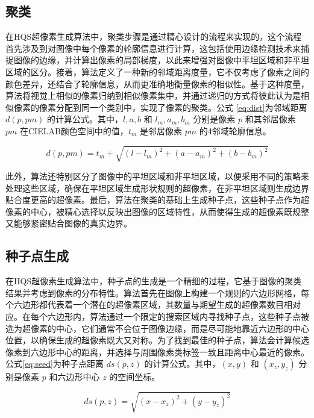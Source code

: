 \newpage

\subsection{聚类}
在HQS超像素生成算法中，聚类步骤是通过精心设计的流程来实现的，这个流程首先涉及到对图像中每个像素的轮廓信息进行计算，这包括使用边缘检测技术来捕捉图像的边缘，并计算出像素的局部梯度，以此来增强对图像中平坦区域和非平坦区域的区分。接着，算法定义了一种新的邻域距离度量，它不仅考虑了像素之间的颜色差异，还结合了轮廓信息，从而更准确地衡量像素的相似性。基于这种度量，算法将视觉上相似的像素归纳到相似像素集中，并通过递归的方式将彼此认为是相似像素的像素分配到同一个类别中，实现了像素的聚类。\cite{achanta2012slic}公式 \eqref{eq:dist}为邻域距离 \( d(p, pm) \) 的计算公式。其中，\( l, a, b \) 和 \( l_m, a_m, b_m \) 分别是像素 \( p \) 和其邻居像素 \( pm \) 在CIELAB颜色空间中的值，\( t_m \) 是邻居像素 \( pm \) 的4邻域轮廓信息。

\begin{equation}
  d(p, pm) = t_m + \sqrt{(l - l_m)^2 + (a - a_m)^2 + (b - b_m)^2}
  \label{eq:dist}
\end{equation}

此外，算法还特别区分了图像中的平坦区域和非平坦区域，以便采用不同的策略来处理这些区域，确保在平坦区域生成形状规则的超像素，在非平坦区域则生成边界贴合度更高的超像素。最后，算法在聚类的基础上生成种子点，这些种子点作为超像素的中心，被精心选择以反映出图像的区域特性，从而使得生成的超像素既规整又能够紧密贴合图像的真实边界。

\subsection{种子点生成}
在HQS超像素生成算法中，种子点的生成是一个精细的过程，它基于图像的聚类结果并考虑到像素的分布特性。算法首先在图像上构建一个规则的六边形网格，每个六边形都代表着一个潜在的超像素区域，其数量与期望生成的超像素数目相对应。在每个六边形内，算法通过一个限定的搜索区域内寻找种子点，这些种子点被选为超像素的中心，它们通常不会位于图像边缘，而是尽可能地靠近六边形的中心位置，以确保生成的超像素既大又对称。为了找到最佳的种子点，算法会计算候选像素到六边形中心的距离，并选择与周围像素类标签一致且距离中心最近的像素。公式\eqref{eq:seed}为种子点距离 \( ds(p, z) \) 的计算公式。其中，\( (x, y) \) 和 \( (x_z, y_z) \) 分别是像素 \( p \) 和六边形中心 \( z \) 的空间坐标。

\begin{equation}
  ds(p, z) = \sqrt{(x - x_z)^2 + (y - y_z)^2}
  \label{eq:seed}
\end{equation}

